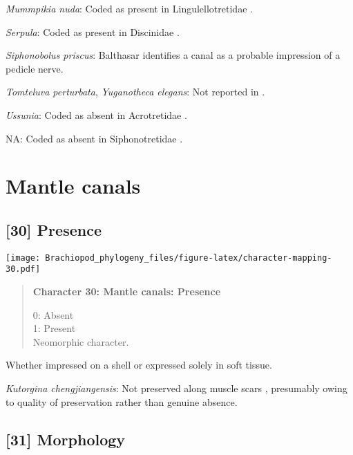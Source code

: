 \documentclass[openany]{book}
\theoremstyle{definition}
\theoremstyle{definition}
\theoremstyle{definition}
\theoremstyle{remark}
\begin{document}
\hypertarget{Mummpikia_nuda-coding-29}{}
\emph{Mummpikia nuda}: Coded as present in Lingulellotretidae
\citep[table 6]{Williams2000LinguliformeaCraniiformea}.

\hypertarget{Serpula-coding-29}{}
\emph{Serpula}: Coded as present in Discinidae \citep[table
6]{Williams2000LinguliformeaCraniiformea}.

\hypertarget{Siphonobolus_priscus-coding-29}{}
\emph{Siphonobolus priscus}: Balthasar
\citeyearpar[p.~274]{Balthasar2008iMummpikia} identifies a canal as a
probable impression of a pedicle nerve.

\hypertarget{Tomteluva_perturbata-coding-29}{}
\emph{Tomteluva perturbata}, \emph{Yuganotheca elegans}: Not reported in
\citet{Williams2000LinguliformeaCraniiformea}.

\hypertarget{Ussunia-coding-29}{}
\emph{Ussunia}: Coded as absent in Acrotretidae \citep[table
6]{Williams2000LinguliformeaCraniiformea}.

\hypertarget{NA-coding-29}{}
NA: Coded as absent in Siphonotretidae \citep[table
6]{Williams2000LinguliformeaCraniiformea}.

\section{Mantle canals}\label{mantle-canals}

\subsection*{{[}30{]} Presence}\label{presence}

\texttt{[image: Brachiopod\_phylogeny\_files/figure-latex/character-mapping-30.pdf]}

\begin{quote}
\textbf{Character 30: Mantle canals: Presence}

0: Absent\\
1: Present\\
Neomorphic character.
\end{quote}

Whether impressed on a shell or expressed solely in soft tissue.

\hypertarget{Kutorgina_chengjiangensis-coding-30}{}
\emph{Kutorgina chengjiangensis}: Not preserved along muscle scars
\citep{Nikitin1984}, presumably owing to quality of preservation rather
than genuine absence.

\subsection*{{[}31{]} Morphology}\label{morphology-1}
\end{document}
